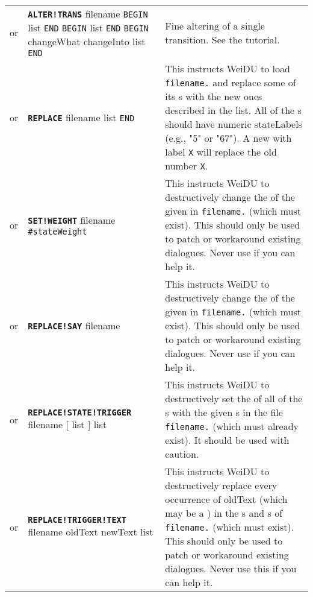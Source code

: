 \documentclass{article}
\def\ttref#1{\ahrefloc{#1}{\tt #1}}
\def\DEFINE#1{{\tt \bf #1}\label{#1}\index{#1}}
\def\DEFSYN#1{{\tt \bf #1}\index{#1}}
\def\t#1{{\tt #1}}
\def\Slist{{\color{red} list }}
\def\Ob{{\color{red} [ }}
\def\Oe{{\color{red} ] }}
\begin{document}
\begin{tabular}{cp{10in}|p{10in}}
  \\

  or & \DEFSYN{ALTER!TRANS} filename
    \t{BEGIN} \ttref{stateNumber} \Slist \t{END}
    \t{BEGIN} \ttref{transNumber} \Slist \t{END}
    \t{BEGIN} changeWhat changeInto \Slist \t{END} &
  Fine altering of a single transition. See the \ttref{ALTER!TRANS} tutorial.

  \\

  or & \DEFINE{REPLACE} filename \ttref{state} \Slist \t{END} &
  This instructs WeiDU to load \t{filename.}\ttref{DLG} and replace some of its 
  \ttref{state}s with the new ones described in the \ttref{state} list.
  All of the \ttref{state}s should have numeric stateLabels (e.g., "5" or
  "67"). A new \ttref{state} with label \t{X} will replace the old
  \ttref{state} number \t{X}.  \\

  or & \DEFINE{SET!WEIGHT} filename \ttref{stateLabel} \tt{\#stateWeight} &
  This instructs WeiDU to destructively change the \ttref{WEIGHT} of the
  given \ttref{state} in \t{filename.}\ttref{DLG} (which must exist). This should only
  be used to patch or workaround existing dialogues. Never use
  \ttref{SET!WEIGHT} if you can help it.  \\

  or & \DEFINE{REPLACE!SAY} filename \ttref{stateLabel} \ttref{sayString} &
  This instructs WeiDU to destructively change the \ttref{sayString} of the
  given \ttref{state} in \t{filename.}\ttref{DLG} (which must exist). This should only
  be used to patch or workaround existing dialogues. Never use
  \ttref{REPLACE!SAY} if you can help it. \\

  or & \DEFINE{REPLACE!STATE!TRIGGER} filename \ttref{stateNumber} 
    \ttref{stateTriggerString} \Ob \ttref{stateNumber} \Slist \Oe
	\ttref{dActionWhen} \Slist &
  This instructs WeiDU to destructively set the
  \ttref{stateTriggerString} of all of the \ttref{state}s with the given
  \ttref{stateNumber}s in the file \t{filename.}\ttref{DLG} (which must already
  exist). It should be used with caution. \\

  or & \DEFINE{REPLACE!TRIGGER!TEXT} filename oldText newText
 \ttref{dActionWhen} \Slist  &
  This instructs WeiDU to destructively replace every occurrence of oldText
  (which may be a \ttref{regexp}) in the \ttref{stateTriggerString}s and
  \ttref{transTriggerString}s of \t{filename.}\ttref{DLG} (which must exist). 
  This should only be used to patch or workaround existing dialogues. Never
  use this if you can help it. \\


\end{tabular}
\end{document}
